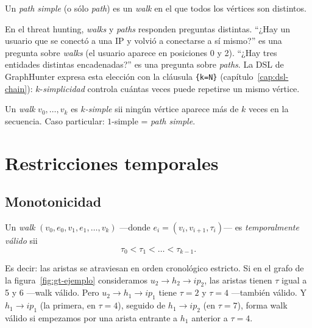 \begin{definition}
Un \emph{path simple} (o sólo \emph{path}) es un \emph{walk} en el
que todos los vértices son distintos.
\end{definition}

\begin{advertencia}
En el threat hunting, \emph{walks} y \emph{paths} responden preguntas
distintas. ``¿Hay un usuario que se conectó a una IP y volvió a
conectarse a sí mismo?'' es una pregunta sobre \emph{walks} (el
usuario aparece en posiciones 0 y 2). ``¿Hay tres entidades distintas
encadenadas?'' es una pregunta sobre \emph{paths}. La DSL de
GraphHunter expresa esta elección con la cláusula \texttt{\{k=N\}}
(capítulo~\ref{cap:dsl-chain}): \(k\)-\emph{simplicidad} controla
cuántas veces puede repetirse un mismo vértice.
\end{advertencia}

\begin{definition}[\(k\)-simplicidad]
Un \emph{walk} \(v_0, \dots, v_k\) es \emph{\(k\)-simple} sii ningún
vértice aparece más de \(k\) veces en la secuencia. Caso particular:
\(1\)-simple = \emph{path simple}.
\end{definition}

\section{Restricciones temporales}

\subsection{Monotonicidad}

\begin{definition}
Un \emph{walk} \((v_0, e_0, v_1, e_1, \dots, v_k)\) ---donde
\(e_i = (v_i, v_{i+1}, \tau_i)\)--- es \emph{temporalmente válido} sii
\[
\tau_0 < \tau_1 < \dots < \tau_{k-1}.
\]
\end{definition}

Es decir: las aristas se atraviesan en orden cronológico estricto. Si
en el grafo de la figura~\ref{fig:gt-ejemplo} consideramos
\(u_2 \to h_2 \to \mathit{ip}_2\), las aristas tienen \(\tau\) igual a
5 y 6 ---walk válido. Pero \(u_2 \to h_1 \to \mathit{ip}_1\) tiene
\(\tau = 2\) y \(\tau = 4\) ---también válido. Y
\(h_1 \to \mathit{ip}_1\) (la primera, en \(\tau = 4\)), seguido de
\(h_1 \to \mathit{ip}_2\) (en \(\tau = 7\)), forma walk válido si
empezamos por una arista entrante a \(h_1\) anterior a \(\tau = 4\).

